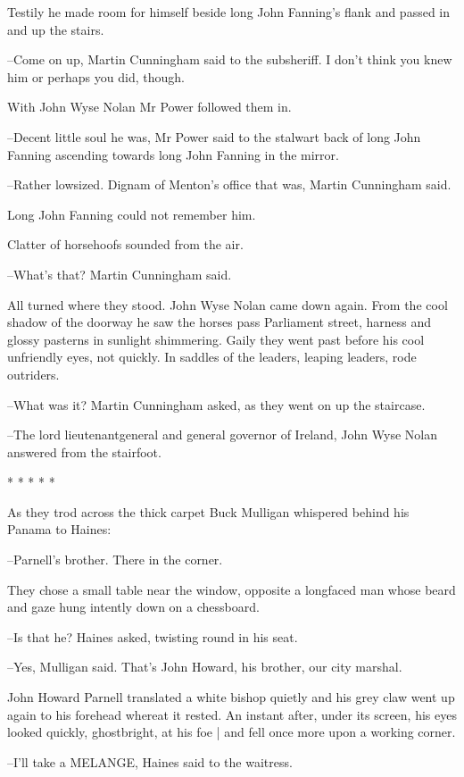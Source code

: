 Testily he made room for himself
beside long John Fanning's flank
and
passed in and up the stairs.

--Come on up,
Martin Cunningham said to the subsheriff.
I don't think you
knew him
or perhaps you did, though.

With John Wyse Nolan
Mr Power followed them in.

--Decent little soul he was,
Mr Power said
to the stalwart back of long
John Fanning
ascending towards long John Fanning in the mirror.

--Rather lowsized.
Dignam of Menton's office that was,
Martin Cunningham
said.

Long John Fanning could not remember him.%

Clatter of horsehoofs sounded from the air.

--What's that? Martin Cunningham said.

All turned where they stood.
John Wyse Nolan came down again.
From the
cool shadow of the doorway
he saw the horses pass Parliament street,
harness and glossy pasterns in sunlight shimmering.
Gaily they went past
before his cool unfriendly eyes,
not quickly.
In saddles of the leaders,
leaping leaders,
rode outriders.

--What was it?
Martin Cunningham asked,
as they went on up the staircase.

--The lord lieutenantgeneral and general governor of Ireland,
John Wyse Nolan answered from the stairfoot.


    * * * * *


As they trod across the thick carpet
Buck Mulligan whispered behind
his Panama to Haines:

--Parnell's brother.
There in the corner.

They chose a small table near the window,
opposite a longfaced man
whose beard and gaze hung intently down on a chessboard.

--Is that he?
Haines asked,
twisting round in his seat.

--Yes,
Mulligan said.
That's John Howard, his brother, our city marshal.

John Howard Parnell translated a white bishop quietly
and his grey claw went up again to his forehead
whereat it rested.
An instant after,
under its screen,
his eyes looked quickly, ghostbright, at his foe |
and fell once more upon a working corner.

--I'll take a MELANGE,
Haines said to the waitress.

